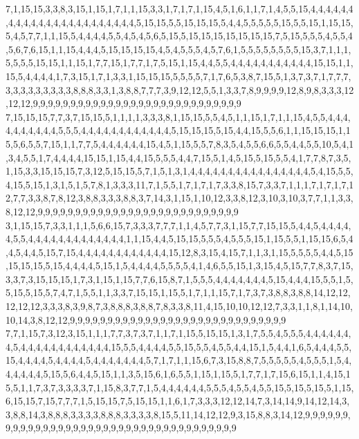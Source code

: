 7,1,15,15,3,3,8,3,15,1,15,1,7,1,1,15,3,3,1,7,1,7,1,15,4,5,1,6,1,1,7,1,4,5,5,15,4,4,4,4,4,4,4,4,4,4,4,4,4,4,4,4,4,4,4,4,4,4,4,5,15,15,5,5,15,15,15,5,4,4,5,5,5,5,5,15,5,5,15,1,15,15,5,4,5,7,7,1,1,15,5,4,4,4,4,5,5,4,5,4,5,6,5,15,5,15,15,15,15,15,15,15,7,5,15,5,5,5,4,5,5,4,5,6,7,6,15,1,1,15,4,4,4,5,15,15,15,15,4,5,4,5,5,5,4,5,7,6,1,5,5,5,5,5,5,5,5,15,3,7,1,1,1,5,5,5,5,15,15,1,1,15,1,7,7,15,1,7,7,1,7,5,15,1,15,4,4,5,5,4,4,4,4,4,4,4,4,4,4,4,15,15,1,1,15,5,4,4,4,4,1,7,3,15,1,7,1,3,3,1,15,15,15,5,5,5,5,7,1,7,6,5,3,8,7,15,5,1,3,7,3,7,1,7,7,7,3,3,3,3,3,3,3,3,3,8,8,8,3,3,1,3,8,8,7,7,7,3,9,12,12,5,5,1,3,3,7,8,9,9,9,9,12,8,9,8,3,3,3,12,12,12,9,9,9,9,9,9,9,9,9,9,9,9,9,9,9,9,9,9,9,9,9,9,9,9,9,9,9,9
7,15,15,15,7,7,3,7,15,15,5,1,1,1,1,3,3,3,8,1,15,15,5,5,4,5,1,1,15,1,7,1,1,15,4,5,5,4,4,4,4,4,4,4,4,4,4,5,5,5,4,4,4,4,4,4,4,4,4,4,4,4,5,15,15,15,5,15,4,4,15,5,5,6,1,1,15,15,15,1,15,5,6,5,5,7,15,1,1,7,7,5,4,4,4,4,4,4,15,4,5,1,15,5,5,7,8,3,5,4,5,5,6,6,5,5,4,4,5,5,10,5,4,1,3,4,5,5,1,7,4,4,4,4,15,15,1,15,4,4,15,5,5,5,4,4,7,15,5,1,4,5,15,5,15,5,5,4,1,7,7,8,7,3,5,1,15,3,3,15,15,15,7,3,12,5,15,15,5,7,1,5,1,3,1,4,4,4,4,4,4,4,4,4,4,4,4,4,4,4,4,5,4,15,5,5,4,15,5,15,1,3,1,5,1,5,7,8,1,3,3,3,11,7,1,5,5,1,7,1,7,1,7,3,3,8,15,7,3,3,7,1,1,1,7,1,7,1,7,12,7,7,3,3,8,7,8,12,3,8,8,3,3,3,8,8,3,7,14,3,1,15,1,10,12,3,3,8,12,3,10,3,10,3,7,7,1,1,3,3,8,12,12,9,9,9,9,9,9,9,9,9,9,9,9,9,9,9,9,9,9,9,9,9,9,9,9,9,9,9
3,1,15,15,7,3,3,1,1,1,5,6,6,15,7,3,3,3,7,7,7,1,1,4,5,7,7,3,1,15,7,7,15,15,5,4,4,5,4,4,4,4,4,5,5,4,4,4,4,4,4,4,4,4,4,4,4,4,1,1,15,4,4,5,15,15,5,5,5,4,5,5,5,15,1,15,5,5,1,15,15,6,5,4,4,5,4,4,5,15,7,15,4,4,4,4,4,4,4,4,4,4,4,4,15,12,8,3,15,4,15,7,1,1,3,1,15,5,5,5,5,4,4,5,15,15,15,15,5,15,4,4,4,4,5,15,1,5,4,4,4,4,5,5,5,5,4,1,4,6,5,5,15,1,3,15,4,5,15,7,7,8,3,7,15,3,3,7,3,15,15,15,1,7,3,1,15,1,15,7,7,6,15,8,7,1,5,5,5,4,4,4,4,4,4,4,5,15,4,4,4,15,5,5,1,5,5,15,5,15,5,7,4,7,1,5,5,1,1,3,3,7,15,15,1,15,5,1,7,1,1,15,7,1,7,3,7,3,8,8,3,8,8,14,12,12,12,12,12,3,3,3,8,3,9,8,7,3,8,8,8,3,8,8,7,8,3,3,8,11,4,15,10,10,12,12,7,3,3,1,1,8,1,14,10,10,14,3,8,12,12,9,9,9,9,9,9,9,9,9,9,9,9,9,9,9,9,9,9,9,9,9,9,9,9,9,9,9,9,9
7,7,1,15,7,3,12,3,15,1,1,1,7,7,3,7,3,7,1,1,7,1,15,5,15,15,1,3,1,7,5,5,4,5,5,5,4,4,4,4,4,4,4,5,4,4,4,4,4,4,4,4,4,4,4,4,15,5,5,4,4,4,4,5,5,15,5,5,4,5,5,4,4,15,1,5,4,4,1,6,5,4,4,4,5,5,15,4,4,4,4,5,4,4,4,4,5,4,4,4,4,4,4,4,5,7,1,7,1,1,15,6,7,3,15,8,8,7,5,5,5,5,5,4,5,5,5,1,5,4,4,4,4,4,4,5,15,5,6,4,4,5,15,1,1,3,5,15,6,1,6,5,5,1,15,1,15,5,1,7,7,1,7,15,6,15,1,1,4,15,15,5,1,1,7,3,7,3,3,3,3,7,1,15,8,3,7,7,1,5,4,4,4,4,4,4,5,5,5,4,5,5,4,5,5,15,5,15,5,15,5,1,15,6,15,15,7,15,7,7,7,1,5,15,15,7,5,15,15,1,1,6,1,7,3,3,3,12,12,14,7,3,14,14,9,14,12,14,3,3,8,8,14,3,8,8,8,3,3,3,3,8,8,8,3,3,3,3,8,15,5,11,14,12,12,9,3,15,8,8,3,14,12,9,9,9,9,9,9,9,9,9,9,9,9,9,9,9,9,9,9,9,9,9,9,9,9,9,9,9,9,9,9,9,9,9,9,9,9,9
